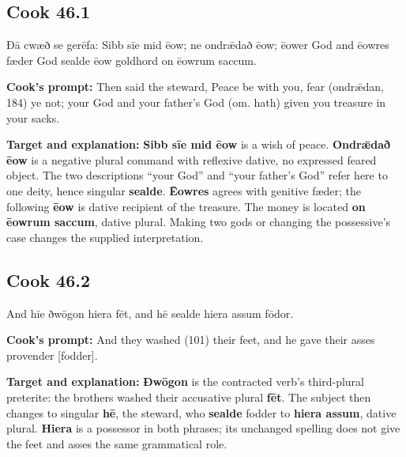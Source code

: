 \par\begin{minipage}{\linewidth}\raggedright
\subsection*{Cook 46.1}

Ðā cwæð se gerēfa: Sibb sīe mid ēow; ne ondrǣdað ēow; ēower God and ēowres fæder God sealde ēow goldhord on ēowrum saccum.

\textbf{Cook’s prompt:} Then said the steward, Peace be with you, fear (ondrǣdan, 184) ye not; your God and your father’s God (om. hath) given you treasure in your sacks.

\textbf{Target and explanation:} \textbf{Sibb sīe mid ēow} is a wish of peace. \textbf{Ondrǣdað ēow} is a negative plural command with reflexive dative, no expressed feared object. The two descriptions “your God” and “your father’s God” refer here to one deity, hence singular \textbf{sealde}. \textbf{Ēowres} agrees with genitive fæder; the following \textbf{ēow} is dative recipient of the treasure. The money is located \textbf{on ēowrum saccum}, dative plural. Making two gods or changing the possessive’s case changes the supplied interpretation.

\end{minipage}\par\addvspace{4pt}

\par\begin{minipage}{\linewidth}\raggedright
\subsection*{Cook 46.2}

And hīe ðwōgon hiera fēt, and hē sealde hiera assum fōdor.

\textbf{Cook’s prompt:} And they washed (101) their feet, and he gave their asses provender [fodder].

\textbf{Target and explanation:} \textbf{Ðwōgon} is the contracted verb’s third-plural preterite: the brothers washed their accusative plural \textbf{fēt}. The subject then changes to singular \textbf{hē}, the steward, who \textbf{sealde} fodder to \textbf{hiera assum}, dative plural. \textbf{Hiera} is a possessor in both phrases; its unchanged spelling does not give the feet and asses the same grammatical role.

\end{minipage}\par\addvspace{4pt}

